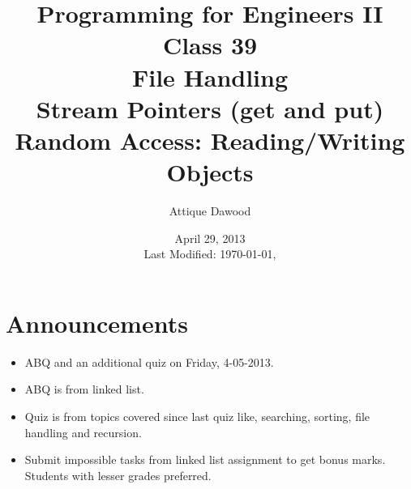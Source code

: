 \documentclass[12pt,a4paper]{article}
\title{\vspace{-2cm}Programming for Engineers II\\Class 39\\File Handling\\Stream Pointers (get and put)\\Random Access: Reading/Writing Objects}
\author{Attique Dawood}
\date{April 29, 2013\\[0.2cm] Last Modified: \today, \currenttime}
\begin{document}
\maketitle
\section{Announcements}
\begin{itemize}
\item ABQ and an additional quiz on Friday, 4-05-2013.
\item ABQ is from linked list.
\item Quiz is from topics covered since last quiz like, searching, sorting, file handling and recursion.
\item Submit impossible tasks from linked list assignment to get bonus marks. Students with lesser grades preferred.
\end{itemize}
\end{document}
